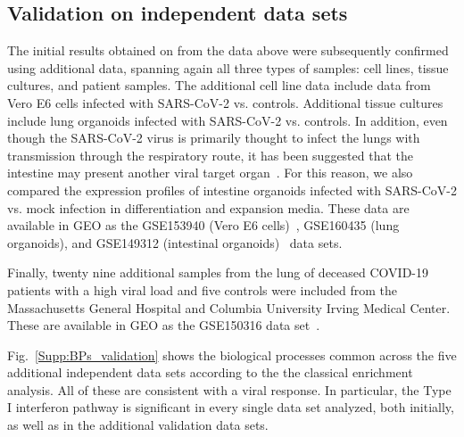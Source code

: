 
\subsection{Validation on independent data sets}
The initial results obtained on from the data above were subsequently confirmed using additional data, spanning again all  three types of samples: cell lines, tissue cultures, and patient samples.   The additional cell line data include data from Vero E6 cells infected with SARS-CoV-2 vs. controls. Additional tissue cultures include lung organoids infected with SARS-CoV-2 vs. controls. In addition, even though the SARS-CoV-2 virus is primarily thought to infect the lungs with transmission through the respiratory route, it has been suggested that the intestine may present another viral target organ~\cite{Lamers:2020}. For this reason, we also compared the expression profiles of intestine organoids infected with SARS-CoV-2 vs. mock infection in differentiation and expansion media. These data are available in GEO as the GSE153940 (Vero E6 cells)~\cite{Riva:2020}, GSE160435 (lung organoids), and GSE149312 (intestinal organoids)~\cite{Lamers:2020} data sets. 



Finally, twenty nine additional samples from the lung of deceased COVID-19 patients with a high viral load and five controls were included from the Massachusetts General Hospital and Columbia University Irving Medical Center. These are available in GEO as the GSE150316 data set~\cite{desai2020temporal}.

 
Fig.~\ref{Supp:BPs_validation} shows the biological processes common across the five additional independent data sets according to the the classical enrichment analysis. All of these are consistent with a viral response. In particular, the Type I interferon pathway is significant in every single data set analyzed, both initially, as well as in the additional validation data sets. 

